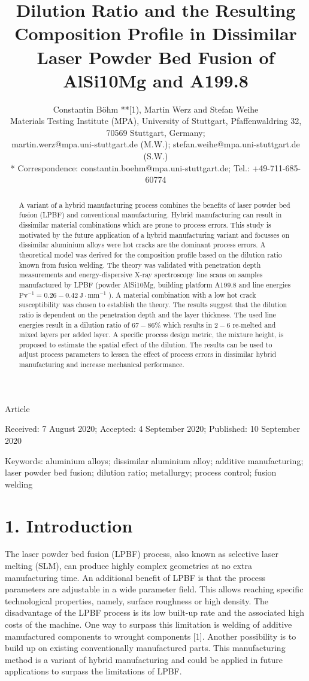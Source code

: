 \documentclass[10pt]{article}
\title{Dilution Ratio and the Resulting Composition Profile in Dissimilar Laser Powder Bed Fusion of AlSi10Mg and A199.8 }
\author{Constantin Böhm **[1), Martin Werz and Stefan Weihe\\
Materials Testing Institute (MPA), University of Stuttgart, Pfaffenwaldring 32, 70569 Stuttgart, Germany;\\
martin.werz@mpa.uni-stuttgart.de (M.W.); stefan.weihe@mpa.uni-stuttgart.de (S.W.)\\
* Correspondence: constantin.boehm@mpa.uni-stuttgart.de; Tel.: +49-711-685-60774}
\date{}
\begin{document}
\maketitle
Article

Received: 7 August 2020; Accepted: 4 September 2020; Published: 10 September 2020

\begin{abstract}
A variant of a hybrid manufacturing process combines the benefits of laser powder bed fusion (LPBF) and conventional manufacturing. Hybrid manufacturing can result in dissimilar material combinations which are prone to process errors. This study is motivated by the future application of a hybrid manufacturing variant and focusses on dissimilar aluminium alloys were hot cracks are the dominant process errors. A theoretical model was derived for the composition profile based on the dilution ratio known from fusion welding. The theory was validated with penetration depth measurements and energy-dispersive X-ray spectroscopy line scans on samples manufactured by LPBF (powder AlSi10Mg, building platform A199.8 and line energies $\mathrm{Pv}^{-1}=0.26-0.42 \mathrm{~J} \cdot \mathrm{mm}^{-1}$ ). A material combination with a low hot crack susceptibility was chosen to establish the theory. The results suggest that the dilution ratio is dependent on the penetration depth and the layer thickness. The used line energies result in a dilution ratio of $67-86 \%$ which results in $2-6$ re-melted and mixed layers per added layer. A specific process design metric, the mixture height, is proposed to estimate the spatial effect of the dilution. The results can be used to adjust process parameters to lessen the effect of process errors in dissimilar hybrid manufacturing and increase mechanical performance.
\end{abstract}

Keywords: aluminium alloys; dissimilar aluminium alloy; additive manufacturing; laser powder bed fusion; dilution ratio; metallurgy; process control; fusion welding

\section*{1. Introduction}
The laser powder bed fusion (LPBF) process, also known as selective laser melting (SLM), can produce highly complex geometries at no extra manufacturing time. An additional benefit of LPBF is that the process parameters are adjustable in a wide parameter field. This allows reaching specific technological properties, namely, surface roughness or high density. The disadvantage of the LPBF process is its low built-up rate and the associated high costs of the machine. One way to surpass this limitation is welding of additive manufactured components to wrought components [1]. Another possibility is to build up on existing conventionally manufactured parts. This manufacturing method is a variant of hybrid manufacturing and could be applied in future applications to surpass the limitations of LPBF.
\end{document}
